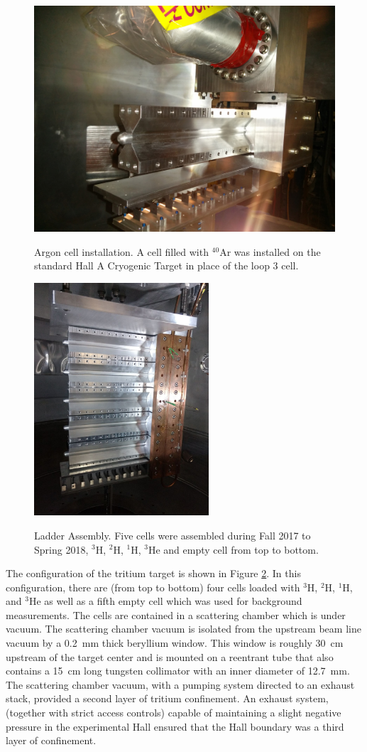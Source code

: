 \documentclass[final,5p,times,twocolumn]{elsarticle}
\begin{document}
\begin{figure}[htbp]
	\centering
	\includegraphics[width=6.5 cm]{images/Ar-cell.jpg}\\
	\caption{Argon cell installation. A cell filled with $^{40}$Ar was installed on the standard Hall A Cryogenic Target in place of the loop 3 cell.}
	\label{argon}
\end{figure}

\begin{figure}[htbp]
  \centering
  \includegraphics[width=6.5cm]{images/ladder.jpg}\\
  \caption{Ladder Assembly. Five cells were assembled during Fall 2017 to Spring 2018, $^{3}$H, $^{2}$H, $^{1}$H, $^{3}$He and empty cell from top to bottom.}
  \label{ladder}
\end{figure}

The configuration of the tritium target is shown in Figure \ref{ladder}. In this configuration, there are (from top to bottom) 
four cells loaded with $^{3}$H, $^{2}$H, $^{1}$H, and $^{3}$He as well as a fifth empty cell which was used for background 
measurements. The cells are contained in a scattering chamber which is under vacuum. The scattering chamber vacuum is isolated 
from the upstream beam line vacuum by a 0.2~mm thick beryllium window. This window is roughly 30~cm upstream of the target center 
and is mounted on a reentrant tube that also contains a 15~cm long tungsten collimator with an inner diameter of 12.7~mm. 
The scattering chamber vacuum, with a pumping system directed to an exhaust stack, provided a second layer of tritium confinement. An 
exhaust system, (together with strict access controls) capable of maintaining a slight negative pressure in the experimental 
Hall ensured that the Hall boundary was a third layer of confinement.
\end{document}
